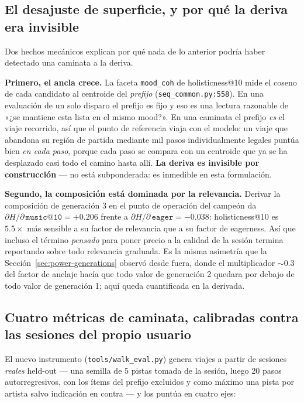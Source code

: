 \documentclass[11pt]{article}
\begin{document}
\subsection{El desajuste de superficie, y por qué la deriva era invisible}
\label{sec:walk-mismatch}
Dos hechos mecánicos explican por qué nada de lo anterior podría haber detectado
una caminata a la deriva.

\textbf{Primero, el ancla crece.} La faceta \texttt{mood\_coh} de
holisticness@10 mide el coseno de cada candidato al centroide del
\emph{prefijo} (\texttt{seq\_common.py:558}). En una evaluación de un solo
disparo el prefijo es fijo y eso es una lectura razonable de «¿se mantiene esta
lista en el mismo mood?». En una caminata el prefijo \emph{es} el viaje
recorrido, así que el punto de referencia viaja con el modelo: un viaje que
abandona su región de partida mediante mil pasos individualmente legales puntúa
bien \emph{en cada paso}, porque cada paso se compara con un centroide que ya se
ha desplazado casi todo el camino hasta allí. \textbf{La deriva es invisible por
construcción} --- no está subponderada: es inmedible en esta formulación.

\textbf{Segundo, la composición está dominada por la relevancia.} Derivar la
composición de generación 3 en el punto de operación del campeón da
$\partial H/\partial\,\texttt{music@10} = +\num{0.206}$ frente a
$\partial H/\partial\,\texttt{eager} = -\num{0.038}$: holisticness@10 es
$\num{5.5}\times$ más sensible a su factor de relevancia que a su factor de
eagerness. Así que incluso el término \emph{pensado} para poner precio a la
calidad de la sesión termina reportando sobre todo relevancia graduada. Es la
misma asimetría que la Sección~\ref{sec:power-generations} observó desde fuera,
donde el multiplicador ${\sim}0.3$ del factor de anclaje hacía que todo valor de
generación 2 quedara por debajo de todo valor de generación 1; aquí queda
cuantificada en la derivada.

\subsection{Cuatro métricas de caminata, calibradas contra las sesiones del propio usuario}
\label{sec:walk-metrics}
El nuevo instrumento (\texttt{tools/walk\_eval.py}) genera viajes a partir de
sesiones \emph{reales} held-out --- una semilla de 5 pistas tomada de la sesión,
luego 20 pasos autorregresivos, con los ítems del prefijo excluidos y como
máximo una pista por artista salvo indicación en contra --- y los puntúa en
cuatro ejes:
\end{document}
